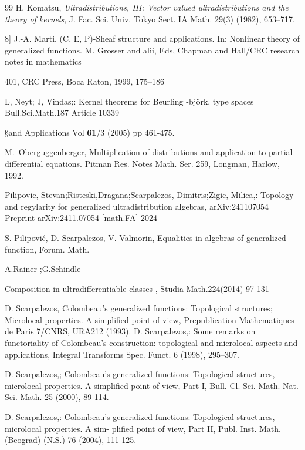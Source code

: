 \documentclass[12pt,a4paper]{amsart}
\begin{document}
\begin{thebibliography}{99}
 H. Komatsu, \textit{Ultradistributions, III: Vector valued ultradistributions and the theory of kernels}, J. Fac. Sci. Univ. Tokyo Sect. IA Math. 29(3) (1982), 653--717.

8] J.-A. Marti. (C, E, P)-Sheaf structure and applications. In: Nonlinear theory of generalized functions. M. Grosser and alii, Eds, Chapman and Hall/CRC research notes in mathematics

401, CRC Press, Boca Raton, 1999, 175–186

L, Neyt;  J, Vindas;:
Kernel theorems for
 Beurling -bj\"{o}rk,  type spaces
Bull.Sci.Math.187
Article 10339

§and Applications Vol {\bf 61}/3 (2005) pp 461-475.

M.\ Oberguggenberger,
{Multiplication of distributions and application to partial
differential equations}.
Pitman Res. Notes Math. Ser. 259, Longman, Harlow, 1992.

Pilipovic, Stevan;Risteski,Dragana;Scarpalezos, Dimitris;Zigic, Milica,:
Topology and regylarity for generalized ultradistribution algebras,
arXiv:241107054
Preprint arXiv:2411.07054  [math.FA] 2024



S. Pilipovi\' c, D. Scarpalezos, V. Valmorin,
{Equalities in algebras of generalized function}, Forum. Math.

A.Rainer ;G.Schindle

Composition in ultradifferentiable classes ,
Studia Math.224(2014) 97-131

 D. Scarpalezos, Colombeau’s generalized functions: Topological structures; Microlocal properties. A simplified point of view, Prepublication Mathematiques de Paris 7/CNRS, URA212
(1993).
 D. Scarpalezos,:
 Some remarks on functoriality of Colombeau’s construction: topological and microlocal aspects and applications, Integral Transforms Spec. Funct. 6 (1998), 295–307.

 D. Scarpalezos,;
 Colombeau’s generalized functions: Topological structures, microlocal properties. A simplified point of view, Part I, Bull. Cl. Sci. Math. Nat. Sci. Math. 25 (2000), 89-114.

 D. Scarpalezos,:
 Colombeau’s generalized functions: Topological structures, microlocal properties. A sim- plified point of view, Part II, Publ. Inst. Math. (Beograd) (N.S.) 76 (2004), 111-125.



\end{thebibliography}
\end{document}
